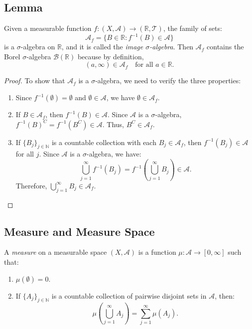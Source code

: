 \documentclass[11pt]{article}
\begin{document}
\subsection{Lemma}
Given a measurable function \(f : (X, \mathcal{A}) \to (\mathbb{R}, \mathcal{T})\), the family of sets:
\[\mathcal{A}_f = \{B \in \mathbb{R} : f^{-1}(B) \in \mathcal{A}\}\]
is a \(\sigma\)-algebra on \(\mathbb{R}\), and it is called the \textit{image \(\sigma\)-algebra}. Then \(\mathcal{A}_f\) contains the Borel \(\sigma\)-algebra \(\mathcal{B}(\mathbb{R})\) because by definition, 
\[(a, \infty) \in \mathcal{A}_f \quad \text{for all } a \in \mathbb{R}.\]

\begin{proof}
To show that \(\mathcal{A}_f\) is a \(\sigma\)-algebra, we need to verify the three properties:
\begin{enumerate}
    \item Since \(f^{-1}(\emptyset) = \emptyset\) and \(\emptyset \in \mathcal{A}\), we have \(\emptyset \in \mathcal{A}_f\).
    \item If \(B \in \mathcal{A}_f\), then \(f^{-1}(B) \in \mathcal{A}\). Since \(\mathcal{A}\) is a \(\sigma\)-algebra, \(f^{-1}(B)^C = f^{-1}(B^C) \in \mathcal{A}\). Thus, \(B^C \in \mathcal{A}_f\).
    \item If \(\{B_j\}_{j \in \mathbb{N}}\) is a countable collection with each \(B_j \in \mathcal{A}_f\), then \(f^{-1}(B_j) \in \mathcal{A}\) for all \(j\). Since \(\mathcal{A}\) is a \(\sigma\)-algebra, we have:
    \[\bigcup_{j=1}^{\infty} f^{-1}(B_j) = f^{-1}\left(\bigcup_{j=1}^{\infty} B_j\right) \in \mathcal{A}.\]
    Therefore, \(\bigcup_{j=1}^{\infty} B_j \in \mathcal{A}_f\).
\end{enumerate}
\end{proof}

\subsection{Measure and Measure Space}
A \textit{measure} on a measurable space \((X, \mathcal{A})\) is a function \(\mu: \mathcal{A} \to [0, \infty]\) such that:
\begin{enumerate}
    \item \(\mu(\emptyset) = 0\).
    \item If \(\{A_j\}_{j \in \mathbb{N}}\) is a countable collection of pairwise disjoint sets in \(\mathcal{A}\), then:
    \[\mu\left(\bigcup_{j=1}^{\infty} A_j\right) = \sum_{j=1}^{\infty} \mu(A_j).\]
\end{enumerate}
\end{document}
